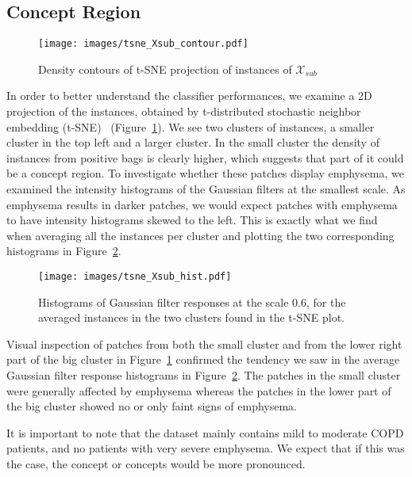 \documentclass[10pt,conference,a4paper]{IEEEtran}
\begin{document}
\subsection{Concept Region}




\begin{figure}[ht]
 \begin{center}
  \texttt{[image: images/tsne\_Xsub\_contour.pdf]}
 \end{center}
 \caption[]{Density contours of t-SNE projection of instances of $\mathcal{X}_{sub}$}
 \label{fig:tsne}
\end{figure}

In order to better understand the classifier performances, we examine a 2D projection of the instances, obtained by t-distributed stochastic neighbor embedding (t-SNE)~\cite{van2008visualizing} (Figure~\ref{fig:tsne}). We see two clusters of instances, a smaller cluster in the top left and a larger cluster. In the small cluster the density of instances from positive bags is clearly higher, which suggests that part of it could be a concept region. To investigate whether these patches display emphysema, we examined the intensity histograms of the Gaussian filters at the smallest scale. As emphysema results in darker patches, we would expect patches with emphysema to have intensity histograms skewed to the left. This is exactly what we find when averaging all the instances per cluster and plotting the two corresponding histograms in Figure~\ref{fig:hist}.

\begin{figure}[ht]
 \centering
  \texttt{[image: images/tsne\_Xsub\_hist.pdf]}

 \caption[]{Histograms of Gaussian filter responses at the scale 0.6, for the averaged instances in the two clusters found in the t-SNE plot.}
 \label{fig:hist}
\end{figure}

Visual inspection of patches from both the small cluster and from the lower right part of the big cluster in Figure~\ref{fig:tsne} confirmed the tendency we saw in the average Gaussian filter response histograms in Figure~\ref{fig:hist}. The patches in the small cluster were generally affected by emphysema whereas the patches in the lower part of the big cluster showed no or only faint signs of emphysema.

It is important to note that the dataset mainly contains mild to moderate COPD patients, and no patients with very severe emphysema. We expect that if this was the case, the concept or concepts would be more pronounced.
\end{document}
